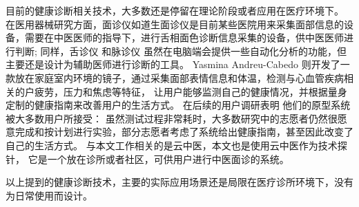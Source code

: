 目前的健康诊断相关技术，大多数还是停留在理论阶段或者应用在医疗环境下。
在医用器械研究方面，面诊仪如道生面诊仪\cite{邸丹2016手持式舌象仪的研制}是目前某些医院用来采集面部信息的设备，需要在中医医师的指导下，进行舌相面色诊断信息采集的设备，供中医医师进行判断;
 同样，舌诊仪\cite{李丹溪2017舌诊仪的发展及其在舌诊客观化研究中的应用现状} 和脉诊仪 \cite{牛婷婷2017脉诊仪}虽然在电脑端会提供一些自动化分析的功能，但主要还是设计为辅助医师进行诊断的工具。
 Yasmina Andreu-Cabedo 则开发了一款放在家庭室内环境的镜子，通过采集面部表情信息和体温，检测与心血管疾病相关的户疲劳，压力和焦虑等特征， 让用户能够监测自己的健康情况，并根据量身定制的健康指南来改善用户的生活方式。
 在后续的用户调研表明\cite{coppini2017user} 他们的原型系统被大多数用户所接受： 虽然测试过程非常耗时，大多数研究中的志愿者仍然很愿意完成和按计划进行实验，部分志愿者考虑了系统给出健康指南，甚至因此改变了自己的生活方式。
与本文工作相关的是云中医\cite{Zhang2018Study}，本文也是使用云中医作为技术探针\cite{Hutchinson2003Technology}， 它是一个放在诊所或者社区，可供用户进行中医面诊的系统。

以上提到的健康诊断技术，主要的实际应用场景还是局限在医疗诊所环境下，没有为日常使用而设计。








